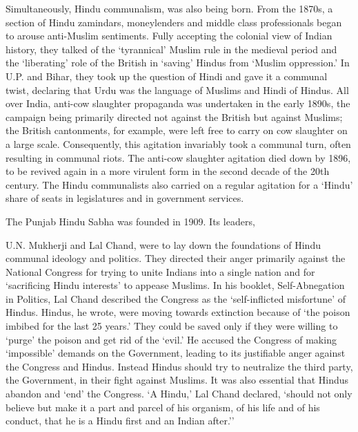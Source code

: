 Simultaneously, Hindu communalism, was also being born. From the 1870s, a section of Hindu zamindars, moneylenders and middle class professionals began to arouse anti-Muslim sentiments. Fully accepting the colonial view of Indian history, they talked of the `tyrannical' Muslim rule in the medieval period and the `liberating' role of the British in `saving' Hindus from `Muslim oppression.' In U.P. and Bihar, they took up the question of Hindi and gave it a communal twist, declaring that Urdu was the language of Muslims and Hindi of Hindus. All over India, anti-cow slaughter propaganda was undertaken in the early 1890s, the campaign being primarily directed not against the British but against Muslims; the British cantonments, for example, were left free to carry on cow slaughter on a large scale. Consequently, this agitation invariably took a communal turn, often resulting in communal riots. The anti-cow slaughter agitation died down by 1896, to be revived again in a more virulent form in the second decade of the 20th century. The Hindu communalists also carried on a regular agitation for a `Hindu' share of seats in legislatures and in government services. 

The Punjab Hindu Sabha was founded in 1909. Its leaders, 

U.N. Mukherji and Lal Chand, were to lay down the foundations of Hindu communal ideology and politics. They directed their anger primarily against the National Congress for trying to unite Indians into a single nation and for `sacrificing Hindu interests' to appease Muslims. In his booklet, Self-Abnegation in Politics, Lal Chand described the Congress as the `self-inflicted misfortune' of Hindus. Hindus, he wrote, were moving towards extinction because of `the poison imbibed for the last 25 years.' They could be saved only if they were willing to `purge' the poison and get rid of the `evil.' He accused the Congress of making `impossible' demands on the Government, leading to its justifiable anger against the Congress and Hindus. Instead Hindus should try to neutralize the third party, the Government, in their fight against Muslims. It was also essential that Hindus abandon and `end' the Congress. `A Hindu,' Lal Chand declared, `should not only believe but make it a part and parcel of his organism, of his life and of his conduct, that he is a Hindu first and an Indian after.'' 


